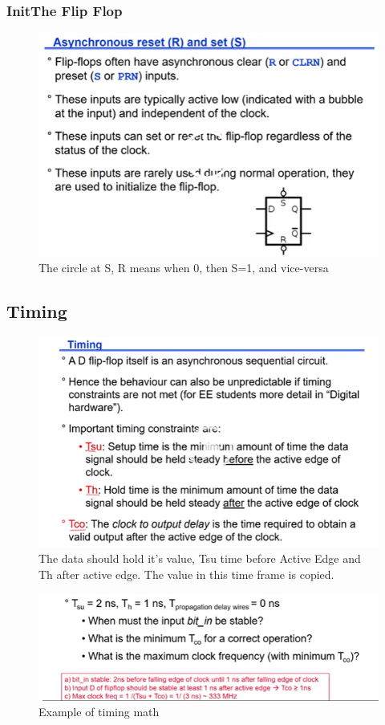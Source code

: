 \documentclass[11pt, a4paper]{article}
\begin{document}
\subsubsection{InitThe Flip Flop}
\begin{figure}[H]
    \centering
    \includegraphics[width = \textwidth]{Pictures/Init the Flip Flop.png}
    \caption{The circle at S, R means when 0, then S=1, and vice-versa}
\end{figure}

\subsection{Timing}
\begin{figure}[H]
    \centering
    \includegraphics[width = \textwidth]{Pictures/Timing.png}
    \caption{The data should hold it's value, Tsu time before Active Edge and Th after active edge. The value in this time frame is copied.}
\end{figure}
\begin{figure}[H]
    \centering
    \includegraphics[width = \textwidth]{Pictures/Shift Reg Ex.png}
    \caption{Example of timing math}
\end{figure}
\end{document}

